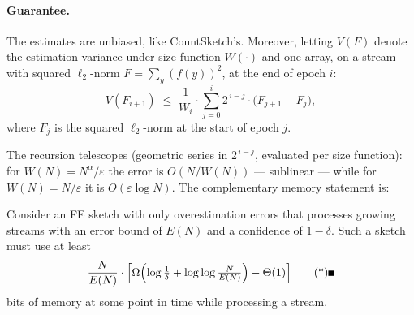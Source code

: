 \paragraph{Guarantee.}

\begin{lemma}
\label{lem:est-sublime-var}
The estimates are unbiased, like CountSketch's. Moreover, letting $V(F)$ denote the estimation
variance under size function $W(\cdot)$ and one array, on a stream with squared $\ell_2$-norm
$F = \sum_y (f(y))^2$, at the end of epoch $i$:
\[
V(F_{i+1}) \;\le\; \frac{1}{W_i}\cdot\sum_{j=0}^{i} 2^{\,i-j}\cdot\bigl(F_{j+1} - F_j\bigr),
\]
where $F_j$ is the squared $\ell_2$-norm at the start of epoch $j$. \eop
\end{lemma}

The recursion telescopes (geometric series in $2^{\,i-j}$, evaluated per size function): for
$W(N) = N^\alpha/\varepsilon$ the error is $O(N/W(N))$ --- sublinear --- while for $W(N) =
N/\varepsilon$ it is $O(\varepsilon\log N)$. The complementary memory statement is:

\begin{theorem}
\label{thm:est-sublime-lb}
Consider an FE sketch with only overestimation errors that processes growing streams with an
error bound of $E(N)$ and a confidence of $1-\delta$. Such a sketch must use at least
\[
\frac{N}{E(N)}\cdot\Bigl[\Omega\Bigl(\log\tfrac{1}{\delta} +
\log\log\tfrac{N}{E(N)}\Bigr) - \Theta(1)\Bigr] \eopm
\]
bits of memory at some point in time while processing a stream.
\end{theorem}

